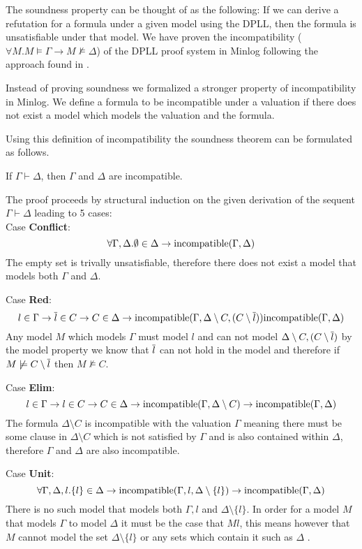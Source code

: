 The soundness property can be thought of as the following: If we can derive a refutation for a formula under a given model using the DPLL, then the formula is unsatisfiable under that model. We have proven the incompatibility ($\forall M. M \models \Gamma \to M \not\models \Delta$)  of the DPLL proof system in Minlog following the approach found in \cite{SL08}. 

Instead of proving soundness we formalized a stronger property of incompatibility in Minlog. We define a formula to be incompatible under a valuation if there does not exist a model which models the valuation and the formula. 

Using this definition of incompatibility the soundness theorem can be formulated as follows.
\medskip
\begin{mytheorem}[Soundness]
If $\Gamma \vdash \Delta$, 
then $\Gamma$ and $\Delta$ are incompatible.

The proof proceeds by structural induction on the given derivation of the sequent $\Gamma \vdash \Delta$ leading to 5 cases: \\
%
Case \textbf{Conflict}:
$$\forall \Gamma, \Delta. \emptyset \in \Delta \to \mathrm{incompatible}(\Gamma,\Delta)$$
The empty set is trivally unsatisfiable, therefore there does not exist a model that models both $\Gamma$ and $\Delta$.

Case \textbf{Red}:
$$l \in \Gamma \to \overline{l} \in C \to C \in \Delta \to \mathrm{incompatible}(\Gamma,\Delta \setminus C, (C \setminus \overline{l})) \mathrm{incompatible}(\Gamma,\Delta)$$
Any model $M$ which models $\Gamma$ must model $l$ and can not model $\Delta \setminus C, (C \setminus \overline{l})$ by the model property we know that $\overline{l}$ can not hold in the model and therefore if $M \not\models C \setminus \overline{l}$ then $M\not\models C$.

Case \textbf{Elim}:
$$l \in \Gamma \to l \in C \to C \in \Delta \to \mathrm{incompatible}(\Gamma,\Delta \setminus C) \to \mathrm{incompatible}(\Gamma,\Delta)$$
The formula $\Delta \setminus C$ is incompatible with the valuation $\Gamma$ meaning there must be some clause in $\Delta \setminus C$ which is not satisfied by $\Gamma$ and is also contained within $\Delta$, therefore $\Gamma$ and $\Delta$ are also incompatible.


Case \textbf{Unit}:
$$\forall \Gamma,\Delta,l. \{l\} \in \Delta \to \mathrm{incompatible}(\Gamma,l,\Delta \setminus \{l \} ) \to  \mathrm{incompatible}(\Gamma,\Delta)$$
There is no such model that models both $\Gamma,l$ and $\Delta \setminus \{ l \}$. In order for a model $M$ that models $\Gamma$ to model $\Delta$ it must be the case that $M l$, this means however that $M$ cannot model the set $\Delta \setminus \{l \}$ or any sets which contain it such as $\Delta$ . 


\end{mytheorem}
